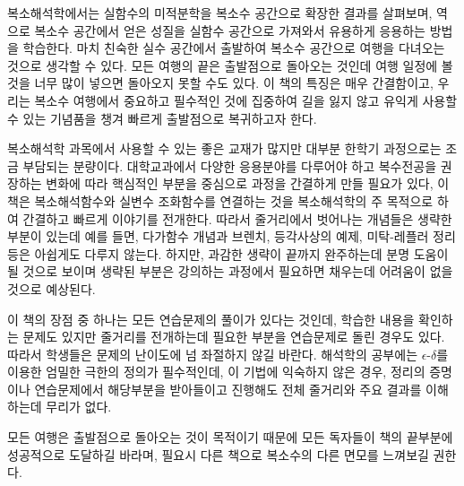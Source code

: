 
복소해석학에서는 실함수의 미적분학을 
복소수 공간으로 확장한 결과를 살펴보며,
역으로 복소수 공간에서 얻은 성질을 
실함수 공간으로 가져와서 유용하게 응용하는 방법을 학습한다. 
마치 친숙한 실수 공간에서 출발하여
복소수 공간으로 여행을 다녀오는 것으로 생각할 수 있다.
모든 여행의 끝은 출발점으로 돌아오는 것인데
여행 일정에 	볼 것을 너무 많이 넣으면  돌아오지 못할 수도 있다.
이 책의 특징은 매우 간결함이고, 우리는 복소수 여행에서
중요하고 필수적인 것에 집중하여
길을 잃지 않고 유익게 사용할 수 있는 기념품을 챙겨 빠르게 출발점으로 복귀하고자 한다.


복소해석학 과목에서 사용할 수 있는 좋은 교재가 많지만
대부분 한학기 과정으로는 조금 부담되는 분량이다. 
대학교과에서 다양한 응용분야를 다루어야 하고 
복수전공을 권장하는 변화에 따라 핵심적인 부분을 중심으로 과정을 간결하게 만들 필요가 있다,
이 책은 복소해석함수와 실변수 조화함수를 연결하는 것을
복소해석학의 주 목적으로 하여 간결하고 빠르게 이야기를 전개한다.
따라서 줄거리에서 벗어나는 개념들은 생략한 부분이 있는데
예를 들면, 다가함수 개념과 브렌치, 등각사상의 예제, 미탁-레플러 정리 등은
아쉽게도 다루지 않는다.
하지만, 과감한 생략이 끝까지 완주하는데 분명 도움이 될 것으로 보이며
생략된 부분은 강의하는 과정에서 필요하면 채우는데 어려움이 없을 것으로 예상된다.

이 책의 장점 중 하나는 모든 연습문제의 풀이가 있다는 것인데,
학습한 내용을 확인하는 문제도 있지만
줄거리를 전개하는데 필요한 부분을 연습문제로 돌린 경우도 있다.
따라서 학생들은 문제의 난이도에 넘 좌절하지 않길 바란다.
해석학의 공부에는 $\epsilon$-$\delta$를 이용한 엄밀한 극한의 정의가
필수적인데, 이 기법에 익숙하지 않은 경우, 정리의 증명이나 연습문제에서 
해당부분을 받아들이고 진행해도 전체 줄거리와 주요 결과를 이해하는데 무리가 없다.

모든 여행은 출발점으로 돌아오는 것이 목적이기 때문에
모든 독자들이 책의 끝부분에 성공적으로 도달하길 바라며,
필요시 다른 책으로 복소수의 다른 면모를 느껴보길 권한다.




\clearpage





